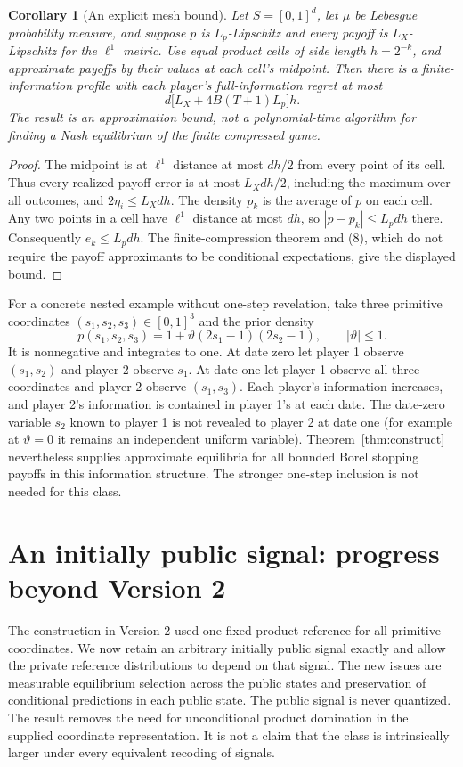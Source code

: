 \documentclass[11pt]{article}
\newtheorem{corollary}[theorem]{Corollary}
\theoremstyle{remark}\newtheorem{remark}[theorem]{Remark}
\begin{document}
\begin{corollary}[An explicit mesh bound]\label{cor:mesh}
Let $S=[0,1]^d$, let $\mu$ be Lebesgue probability measure, and suppose
$p$ is $L_p$-Lipschitz and every payoff is $L_X$-Lipschitz for the
$\ell^1$ metric. Use equal product cells of side length $h=2^{-k}$,
and approximate payoffs by their values at each cell's midpoint.
Then there is a finite-information profile with each player's
full-information regret at most
\[
 d\bigl[L_X+4B(T+1)L_p\bigr]h.
\]
The result is an approximation bound, not a polynomial-time algorithm
for finding a Nash equilibrium of the finite compressed game.
\end{corollary}
\begin{proof}
The midpoint is at $\ell^1$ distance at most $dh/2$ from every point
of its cell. Thus every realized payoff error is at most $L_Xdh/2$,
including the maximum over all outcomes, and $2\eta_i\leq L_Xdh$.
The density $p_k$ is the average of $p$ on each cell. Any two points
in a cell have $\ell^1$ distance at most $dh$, so
$|p-p_k|\leq L_pdh$ there. Consequently $e_k\leq L_pdh$.
The finite-compression theorem and (8), which do not require the payoff
approximants to be conditional expectations, give the displayed bound.
\end{proof}

For a concrete nested example without one-step revelation, take three
primitive coordinates $(s_1,s_2,s_3)\in[0,1]^3$ and the prior density
\[
 p(s_1,s_2,s_3)=1+\vartheta(2s_1-1)(2s_2-1),
 \qquad |\vartheta|\leq1.
\]
It is nonnegative and integrates to one. At date zero let player 1
observe $(s_1,s_2)$ and player 2 observe $s_1$. At date one let player 1
observe all three coordinates and player 2 observe $(s_1,s_3)$.
Each player's information increases, and player 2's information is
contained in player 1's at each date. The date-zero variable $s_2$
known to player 1 is not revealed to player 2 at date one (for example
at $\vartheta=0$ it remains an independent uniform variable).
Theorem~\ref{thm:construct} nevertheless supplies approximate equilibria
for all bounded Borel stopping payoffs in this information structure.
The stronger one-step inclusion is not needed for this class.

\section*{An initially public signal: progress beyond Version 2}
The construction in Version 2 used one fixed product reference for all
primitive coordinates. We now retain an arbitrary initially public signal
exactly and allow the private reference distributions to depend on that
signal. The new issues are measurable equilibrium selection across the
public states and preservation of conditional predictions in each public
state. The public signal is never quantized. The result removes the need
for unconditional product domination in the supplied coordinate
representation. It is not a claim that the class is intrinsically larger
under every equivalent recoding of signals.
\end{document}
